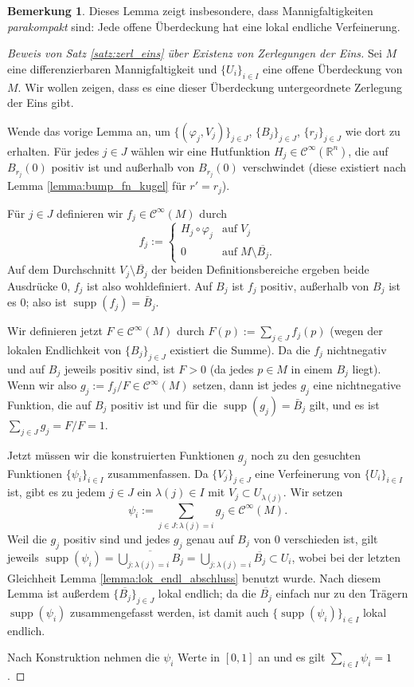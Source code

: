 \documentclass[a4paper]{scrreprt}
\numberwithin{equation}{chapter}
\DeclareMathOperator{\supp}{supp}
\newcommand{\R}{\mathbb{R}}
\newcommand{\sC}{\mathcal{C}^{\infty}}
\theoremstyle{definition}
\newtheorem{bem}[defn]{Bemerkung}
\begin{document}
\begin{bem}
	Dieses Lemma zeigt insbesondere, dass Mannigfaltigkeiten \emph{parakompakt} sind: Jede offene Überdeckung hat eine lokal endliche Verfeinerung.
\end{bem}

\begin{proof}[Beweis von Satz \ref{satz:zerl_eins} über Existenz von Zerlegungen der Eins]
	Sei $M$ eine differenzierbaren Mannigfaltigkeit und $\{U_i\}_{i\in I}$ eine offene Überdeckung von $M$. Wir wollen zeigen, dass es eine dieser Überdeckung untergeordnete Zerlegung der Eins gibt.

	Wende das vorige Lemma an, um $\{(\varphi_j,V_j)\}_{j\in J}$, $\{B_j\}_{j\in J}$, $\{r_j\}_{j\in J}$ wie dort zu erhalten. Für jedes $j\in J$ wählen wir eine Hutfunktion $H_j \in \sC(\R^n)$, die auf $B_{r_j}(0)$ positiv ist und außerhalb von $B_{r_j}(0)$ verschwindet (diese existiert nach Lemma \ref{lemma:bump_fn_kugel} für $r' = r_j$).

	Für $j\in J$ definieren wir $f_j \in \sC(M)$ durch
	\[f_j := \begin{cases}
	H_j \circ \varphi_j & \text{auf} \; V_j\\
	0 & \text{auf} \; M \setminus \overline{B_j}.
	\end{cases}\]
	Auf dem Durchschnitt $V_j \setminus \overline{B_j}$ der beiden Definitionsbereiche ergeben beide Ausdrücke 0, $f_j$ ist also wohldefiniert. Auf $B_j$ ist $f_j$ positiv, außerhalb von $B_j$ ist es 0; also ist $\supp(f_j) = \bar B_j$.

	Wir definieren jetzt $F \in \sC(M)$ durch $F(p) := \sum_{j\in J} f_j(p)$ (wegen der lokalen Endlichkeit von $\{B_j\}_{j\in J}$ existiert die Summe). Da die $f_j$ nichtnegativ und auf $B_j$  jeweils positiv sind, ist $F > 0$ (da jedes $p\in M$ in einem $B_j$ liegt). Wenn wir also $g_j := f_j / F \in \sC(M)$ setzen, dann ist jedes $g_j$ eine nichtnegative Funktion, die auf $B_j$ positiv ist und für die $\supp(g_j) = \bar B_j$ gilt, und es ist $\sum_{j \in J} g_j = F/F = 1$.

	Jetzt müssen wir die konstruierten Funktionen $g_j$ noch zu den gesuchten Funktionen $\{\psi_i\}_{i\in I}$ zusammenfassen. Da $\{V_j\}_{j\in J}$ eine Verfeinerung von $\{U_i\}_{i\in I}$ ist, gibt es zu jedem $j \in J$ ein $\lambda(j) \in I$ mit $V_j \subset U_{\lambda(j)}$. Wir setzen
	\[\psi_i := \sum_{j\in J: \lambda(j) = i} g_j \in \sC(M).\]
	Weil die $g_j$ positiv sind und jedes $g_j$ genau auf $B_j$ von 0 verschieden ist, gilt jeweils $\supp(\psi_i) = \overline{\bigcup_{j: \lambda(j) = i} B_j} = \bigcup_{j: \lambda(j) = i} \overline{B_j} \subset U_i$, wobei bei der letzten Gleichheit Lemma \ref{lemma:lok_endl_abschluss} benutzt wurde. Nach diesem Lemma ist außerdem $\{\overline{B_j}\}_{j\in J}$ lokal endlich; da die $\overline{B_j}$ einfach nur zu den Trägern $\supp(\psi_i)$ \glqq zusammengefasst werden\grqq, ist damit auch $\{\supp(\psi_i)\}_{i\in I}$ lokal endlich.

	Nach Konstruktion nehmen die $\psi_i$ Werte in $[0,1]$ an und es gilt $\sum_{i\in I} \psi_i = 1$.
\end{proof}
\end{document}
